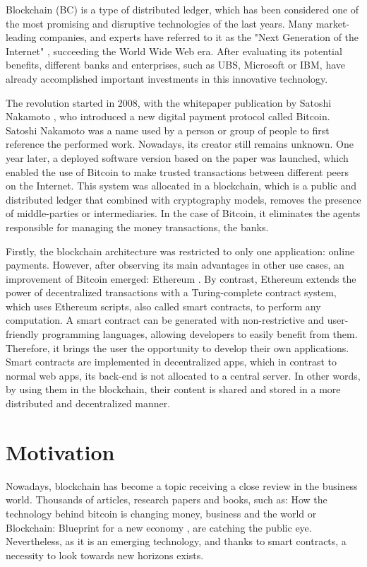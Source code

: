 Blockchain (BC) is a type of distributed ledger, which has been considered one of the most promising and disruptive technologies of the last years. Many market-leading companies, and experts have referred to it as the "Next Generation of the Internet" \cite{JenClarck2017}, succeeding the World Wide Web era. After evaluating its potential benefits, different banks and enterprises, such as UBS, Microsoft or IBM, have already accomplished important investments in this innovative technology.

The revolution started in 2008, with the whitepaper publication by Satoshi Nakamoto \cite{nakamoto2008bitcoin}, who introduced a new digital payment protocol called Bitcoin. Satoshi Nakamoto was a name used by a person or group of people to first reference the performed work. Nowadays, its creator still remains unknown. One year later, a deployed software version based on the paper was launched, which enabled the use of Bitcoin to make trusted transactions between different peers on the Internet. This system was allocated in a blockchain, which is a public and distributed ledger that combined with cryptography models, removes the presence of middle-parties or intermediaries. In the case of Bitcoin, it eliminates the agents responsible for managing the money transactions, the banks.

Firstly, the blockchain architecture was restricted to only one application: online payments. However, after observing its main advantages in other use cases, an improvement of Bitcoin emerged: Ethereum \citep{buterin2014next}. By contrast, Ethereum extends the power of decentralized transactions with a Turing-complete contract system, which uses Ethereum scripts, also called smart contracts, to perform any computation. A smart contract can be generated with non-restrictive and user-friendly programming languages, allowing developers to easily benefit from them. Therefore, it brings the user the opportunity to develop their own applications. Smart contracts are implemented in decentralized apps, which in contrast to normal web apps, its back-end is not allocated to a central server. In other words, by using them in the blockchain, their content is shared and stored in a more distributed and decentralized manner.

\section{Motivation}

Nowadays, blockchain has become a topic receiving a close review in the business world. Thousands of articles, research papers and books, such as: How the technology behind bitcoin is changing money, business and the world \cite{tapscott2016blockchain} or Blockchain: Blueprint for a new economy \cite{swan2015blockchain}, are catching the public eye. Nevertheless, as it is an emerging technology, and thanks to smart contracts, a necessity to look towards new horizons exists.

